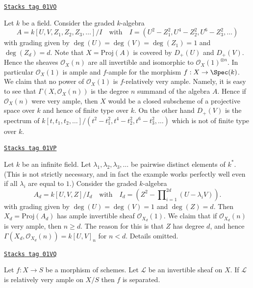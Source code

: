\begin{example}
\label{morphisms-example-not-finite-type-proj}
\href{https://stacks.math.columbia.edu/tag/01VO}{\texttt{Stacks tag 01VO}}

Let $k$ be a field.
Consider the graded $k$-algebra
$$
A = k[U, V, Z_1, Z_2, Z_3, \ldots]/I
\quad
\text{with}
\quad
I = (U^2 - Z_1^2, U^4 - Z_2^2, U^6 - Z_3^2, \ldots)
$$
with grading given by $\deg(U) = \deg(V) = \deg(Z_1) = 1$
and $\deg(Z_d) = d$.
Note that $X = \text{Proj}(A)$ is covered by $D_{+}(U)$ and
$D_{+}(V)$. Hence the sheaves $\mathcal{O}_X(n)$ are all
invertible and isomorphic to $\mathcal{O}_X(1)^{\otimes n}$.
In particular $\mathcal{O}_X(1)$ is ample and $f$-ample
for the morphism $f : X \to \Spec(k)$.
We claim that no power of $\mathcal{O}_X(1)$ is $f$-relatively very ample.
Namely, it is easy to see that $\Gamma(X, \mathcal{O}_X(n))$
is the degree $n$ summand of the algebra $A$. Hence if $\mathcal{O}_X(n)$
were very ample, then $X$ would be a closed subscheme of a projective
space over $k$ and hence of finite type over $k$. On the other hand
$D_{+}(V)$ is the spectrum of
$k[t, t_1, t_2, \ldots]/(t^2 - t_1^2, t^4 - t_2^2, t^6 - t_3^2, \ldots)$
which is not of finite type over $k$.
\end{example}

\begin{example}
\label{morphisms-example-not-bounded}
\href{https://stacks.math.columbia.edu/tag/01VP}{\texttt{Stacks tag 01VP}}

Let $k$ be an infinite field. Let $\lambda_1, \lambda_2, \lambda_3, \ldots$
be pairwise distinct elements of $k^*$. (This is not strictly necessary,
and in fact the example works perfectly well even if all $\lambda_i$
are equal to $1$.)
Consider the graded $k$-algebra
$$
A_d = k[U, V, Z]/I_d
\quad
\text{with}
\quad
I_d = (Z^2 - \prod\nolimits_{i = 1}^{2d} (U - \lambda_i V)).
$$
with grading given by $\deg(U) = \deg(V) = 1$ and $\deg(Z) = d$.
Then $X_d = \text{Proj}(A_d)$ has ample invertible sheaf
$\mathcal{O}_{X_d}(1)$. We claim that if $\mathcal{O}_{X_d}(n)$
is very ample, then $n \geq d$. The reason for this is that $Z$
has degree $d$, and hence $\Gamma(X_d, \mathcal{O}_{X_d}(n)) =
k[U, V]_n$ for $n < d$. Details omitted.
\end{example}

\begin{lemma}
\label{morphisms-lemma-relatively-very-ample-separated}
\href{https://stacks.math.columbia.edu/tag/01VQ}{\texttt{Stacks tag 01VQ}}

Let $f : X \to S$ be a morphism of schemes.
Let $\mathcal{L}$ be an invertible sheaf on $X$.
If $\mathcal{L}$ is relatively very ample on $X/S$ then
$f$ is separated.
\end{lemma}

